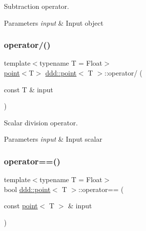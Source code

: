 Subtraction operator. 


\begin{DoxyParams}{Parameters}
{\em input} & Input object \\
\hline
\end{DoxyParams}
\mbox{\label{classddd_1_1point_a9f347ae983daa189f3d7a127dbacc057}} 
\subsubsection{\texorpdfstring{operator/()}{operator/()}}
{\footnotesize\ttfamily template$<$typename T = Float$>$ \\
\hyperlink{classddd_1_1point}{point}$<$T$>$ \hyperlink{classddd_1_1point}{ddd\+::point}$<$ T $>$\+::operator/ (\begin{DoxyParamCaption}\item[{const T \&}]{input }\end{DoxyParamCaption})\hspace{0.3cm}{\ttfamily [inline]}}



Scalar division operator. 


\begin{DoxyParams}{Parameters}
{\em input} & Input scalar \\
\hline
\end{DoxyParams}
\mbox{\label{classddd_1_1point_a98f8e8097257f053b85e1ee32352fda4}} 
\subsubsection{\texorpdfstring{operator==()}{operator==()}}
{\footnotesize\ttfamily template$<$typename T = Float$>$ \\
bool \hyperlink{classddd_1_1point}{ddd\+::point}$<$ T $>$\+::operator== (\begin{DoxyParamCaption}\item[{const \hyperlink{classddd_1_1point}{point}$<$ T $>$ \&}]{input }\end{DoxyParamCaption})\hspace{0.3cm}{\ttfamily [inline]}}



